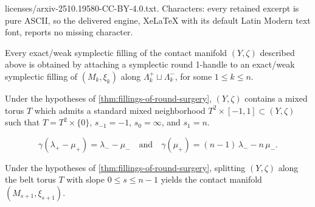 \documentclass[10pt,a4paper]{amsart}
\begin{document}
licenses/arxiv-2510.19580-CC-BY-4.0.txt. Characters: every retained excerpt is pure ASCII, so the delivered engine, XeLaTeX with its default Latin Modern text font, reports no missing character.
\begin{thm}\label{thm:fillings-of-round-surgery}
Every exact/weak symplectic filling of the contact manifold $(Y,\zeta)$ described above is obtained by attaching a symplectic round 1-handle to an exact/weak symplectic filling of $(M_k,\xi_k)$ along $\Lambda_k^+\sqcup\Lambda_k^-$, for some $1\leq k\leq n$.
\end{thm}

\begin{prop}\label{prop:mixed-belt-torus}
Under the hypotheses of \cref{thm:fillings-of-round-surgery}, $(Y,\zeta)$ contains a mixed torus $T$ which admits a standard mixed neighborhood $T^2\times[-1,1]\subset (Y,\zeta)$ such that $T=T^2\times\{0\}$, $s_{-1}=-1$, $s_0=\infty$, and $s_1=n$.
\end{prop}

\begin{equation}\label{eq:gluing-map}
\gamma(\lambda_+-\mu_+) = \lambda_- - \mu_-
\quad\text{and}\quad
\gamma(\mu_+) = (n-1)\,\lambda_- - n\,\mu_-.
\end{equation}

\begin{prop}\label{prop:splitting-along-belt-torus}
Under the hypotheses of \cref{thm:fillings-of-round-surgery}, splitting $(Y,\zeta)$ along the belt torus $T$ with slope $0\leq s\leq n-1$ yields the contact manifold $(M_{s+1},\xi_{s+1})$.
\end{prop}
\end{document}
